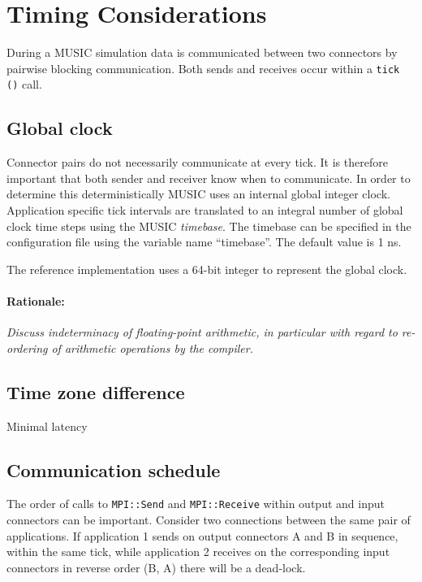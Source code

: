 \documentclass[a4paper]{report}
\newenvironment{rationale}%
{\par\paragraph{Rationale:}}%
{\par}
\begin{document}
\section{Timing Considerations}

During a MUSIC simulation data is communicated between two connectors
by pairwise blocking communication.  Both sends and receives occur
within a \lstinline|tick ()| call.

\subsection{Global clock}

Connector pairs do not necessarily communicate at every tick.  It is
therefore important that both sender and receiver know when to
communicate.  In order to determine this deterministically MUSIC uses
an internal global integer clock.  Application specific tick intervals
are translated to an integral number of global clock time steps using
the MUSIC \emph{timebase}.  The timebase can be specified in the
configuration file using the variable name ``timebase''.  The default
value is 1 ns.

The reference implementation uses a 64-bit integer to represent the
global clock.

\begin{rationale}
  \emph{Discuss indeterminacy of floating-point arithmetic, in particular
    with regard to re-ordering of arithmetic operations by the compiler.}
\end{rationale}

\subsection{Time zone difference}

Minimal latency

\subsection{Communication schedule}

The order of calls to \lstinline|MPI::Send| and \lstinline|MPI::Receive| within
output and input connectors can be important.  Consider two
connections between the same pair of applications.  If application 1
sends on output connectors A and B in sequence, within the same tick,
while application 2 receives on the corresponding input connectors in
reverse order (B, A) there will be a dead-lock.
\end{document}
